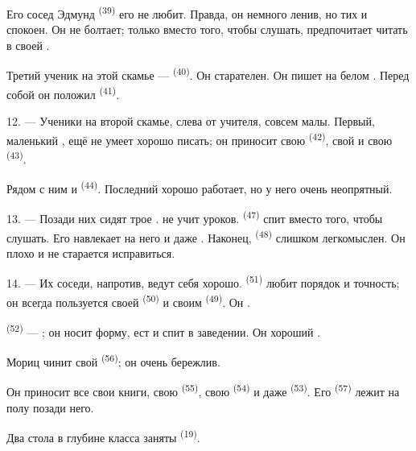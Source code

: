 Его сосед Эдмунд \textsuperscript{(39)} его не любит. Правда, он немного ленив,
но тих и спокоен. Он не болтает; только вместо того, чтобы слушать,
предпочитает читать  в своей .

Третий ученик на этой скамье ---  \textsuperscript{(40)}. Он
старателен. Он пишет на белом . Перед собой он
положил  \textsuperscript{(41)}.

12. --- Ученики на второй скамье, слева от учителя, совсем малы. Первый,
маленький , ещё не умеет хорошо писать; он приносит свою
 \textsuperscript{(42)}, свой  и свою
 \textsuperscript{(43)}.

Рядом с ним  и  \textsuperscript{(44)}. Последний
хорошо работает, но  у него очень неопрятный.

13. --- Позади них сидят трое .  не учит
уроков.  \textsuperscript{(47)} спит вместо того, чтобы слушать. Его
 навлекает на него  и даже .
Наконец,  \textsuperscript{(48)} слишком легкомыслен. Он плохо
 и не старается исправиться.

14. --- Их соседи, напротив, ведут себя хорошо. 
\textsuperscript{(51)} любит порядок и точность; он всегда пользуется своей
 \textsuperscript{(50)} и своим  \textsuperscript{(49)}.
Он .

 \textsuperscript{(52)} --- ; он носит форму, ест
и спит в заведении. Он хороший .

Мориц чинит свой   \textsuperscript{(56)};
он очень бережлив.

Он приносит все свои книги, свою  \textsuperscript{(55)}, свою
 \textsuperscript{(54)} и даже 
\textsuperscript{(53)}. Его  \textsuperscript{(57)} лежит на полу позади
него.

Два стола в глубине класса заняты 
\textsuperscript{(19)}.

\VUsaut{4.6mm}
\VUsaut{3.4mm}

